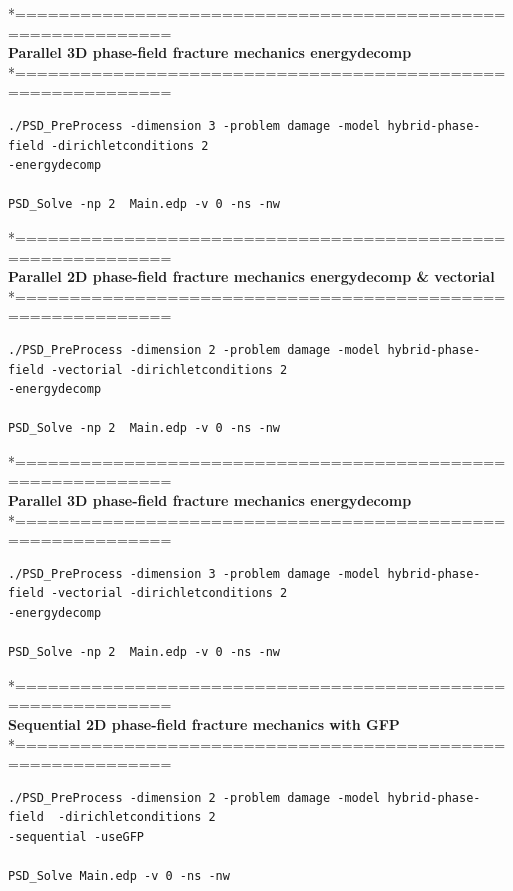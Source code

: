 *============================================================\\
\textbf{ Parallel 3D phase-field fracture mechanics energydecomp }\\
*============================================================\\
\begin{lstlisting}[style=Linux]
./PSD_PreProcess -dimension 3 -problem damage -model hybrid-phase-field -dirichletconditions 2 
-energydecomp   

PSD_Solve -np 2  Main.edp -v 0 -ns -nw   
\end{lstlisting}
*============================================================\\
\textbf{ Parallel 2D phase-field fracture mechanics energydecomp \& vectorial}\\
*============================================================\\
\begin{lstlisting}[style=Linux]
./PSD_PreProcess -dimension 2 -problem damage -model hybrid-phase-field -vectorial -dirichletconditions 2 
-energydecomp   

PSD_Solve -np 2  Main.edp -v 0 -ns -nw   
\end{lstlisting}
*============================================================\\
\textbf{ Parallel 3D phase-field fracture mechanics energydecomp }\\
*============================================================\\
\begin{lstlisting}[style=Linux]
./PSD_PreProcess -dimension 3 -problem damage -model hybrid-phase-field -vectorial -dirichletconditions 2 
-energydecomp   

PSD_Solve -np 2  Main.edp -v 0 -ns -nw   
\end{lstlisting}
*============================================================\\
\textbf{ Sequential 2D phase-field fracture mechanics with GFP }\\
*============================================================\\
\begin{lstlisting}[style=Linux]
./PSD_PreProcess -dimension 2 -problem damage -model hybrid-phase-field  -dirichletconditions 2 
-sequential -useGFP   

PSD_Solve Main.edp -v 0 -ns -nw   
\end{lstlisting}
